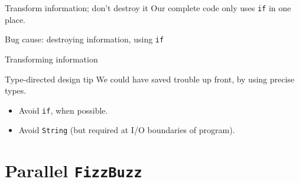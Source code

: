 \begin{frame}[fragile]{Transform information; don't destroy it}
  Our complete code only uses \texttt{if} in one place.

  \begin{block}{Bug cause: destroying information, using \texttt{if}} 
  \end{block}

  \begin{block}{Transforming information}
  \end{block}

  \begin{block}{Type-directed design tip}
    We could have saved trouble \alert{up front}, by using precise \alert{types}.
    \begin{itemize}
    \item Avoid \texttt{if}, when possible.
    \item Avoid \texttt{String} (but required at I/O boundaries of program).
    \end{itemize}
  \end{block}
\end{frame}

\section{Parallel \texttt{FizzBuzz}}

